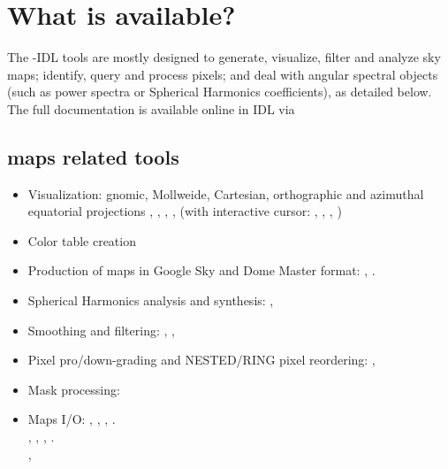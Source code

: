 \section{What is available?}



The \healpixns-IDL tools are mostly designed to 
generate, visualize, filter and analyze sky maps;
identify, query and process \healpix pixels; 
and deal with angular spectral objects (such as power spectra or Spherical
Harmonics coefficients), 
as detailed below.
The full documentation is available online in IDL via 
\subsection[Maps related tools]{\healpix maps related tools}
\begin{itemize} 
%
\item Visualization: gnomic, Mollweide, Cartesian,
orthographic and azimuthal equatorial projections
, 
, 
, 
, 
(with interactive cursor:
,
,
,
)
%
\item Color table creation 
%
\item Production of \healpix maps in Google Sky and Dome Master format:
,
.
% 
\item Spherical Harmonics analysis and synthesis:
,
%
\item Smoothing and filtering:
,
,
%
\item Pixel pro/down-grading and NESTED/RING pixel reordering:
,
%
\item Mask processing:
%
\item Maps I/O:
,
,
,
.\\
,
, 
,
. \\
,
\end{itemize}

